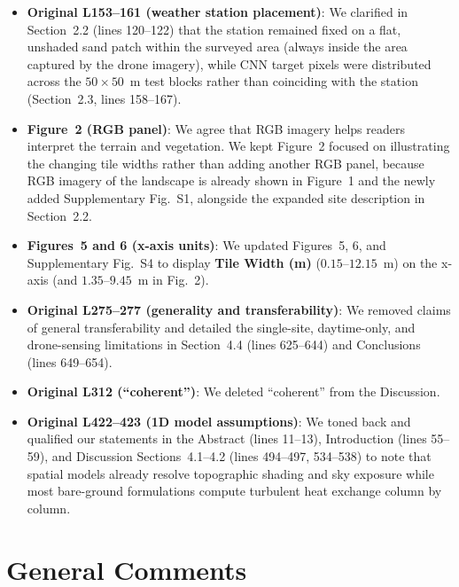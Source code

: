 \documentclass[12pt,english]{reviewresponse}
\begin{document}
\begin{revresponse}
\begin{itemize}[leftmargin=*, itemsep=0.2em]
    \item \textbf{Original L153--161 (weather station placement)}: We clarified in Section~2.2 (lines 120--122) that the station remained fixed on a flat, unshaded sand patch within the surveyed area (always inside the area captured by the drone imagery), while CNN target pixels were distributed across the $50\times 50$~m test blocks rather than coinciding with the station (Section~2.3, lines 158--167).
    \item \textbf{Figure~2 (RGB panel)}: We agree that RGB imagery helps readers interpret the terrain and vegetation. We kept Figure~2 focused on illustrating the changing tile widths rather than adding another RGB panel, because RGB imagery of the landscape is already shown in Figure~1 and the newly added Supplementary Fig.~S1, alongside the expanded site description in Section~2.2.
    \item \textbf{Figures~5 and 6 (x-axis units)}: We updated Figures~5, 6, and Supplementary Fig.~S4 to display \textbf{Tile Width (m)} ($0.15\text{--}12.15$~m) on the x-axis (and $1.35\text{--}9.45$~m in Fig.~2).
    \item \textbf{Original L275--277 (generality and transferability)}: We removed claims of general transferability and detailed the single-site, daytime-only, and drone-sensing limitations in Section~4.4 (lines 625--644) and Conclusions (lines 649--654).
    \item \textbf{Original L312 (``coherent'')}: We deleted ``coherent'' from the Discussion.
    \item \textbf{Original L422--423 (1D model assumptions)}: We toned back and qualified our statements in the Abstract (lines 11--13), Introduction (lines 55--59), and Discussion Sections~4.1--4.2 (lines 494--497, 534--538) to note that spatial models already resolve topographic shading and sky exposure while most bare-ground formulations compute turbulent heat exchange column by column.
\end{itemize}
\end{revresponse}

\clearpage

\reviewer

\section*{General Comments}
\end{document}
